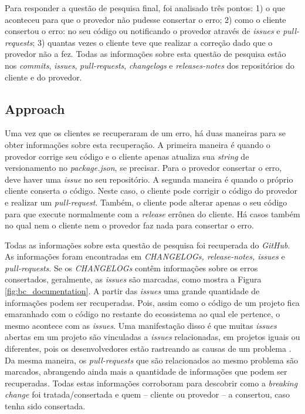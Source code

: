 Para responder a questão de pesquisa final, foi analisado três pontos: 1) o que aconteceu para que o provedor não pudesse consertar o erro; 2) como o cliente consertou o erro: no seu código ou notificando o provedor através de \textit{issues} e \textit{pull-requests}; 3) quantas vezes o cliente teve que realizar a correção dado que o provedor não a fez. Todas as informações sobre esta questão de pesquisa estão nos \textit{commits}, \textit{issues}, \textit{pull-requests}, \textit{changelogs} e \textit{releases-notes} dos repositórios do cliente e do provedor.

\subsection{Approach}
\label{apr:rq3}

Uma vez que os clientes se recuperaram de um erro, há duas maneiras para se obter informações sobre esta recuperação. A primeira maneira é quando o provedor corrige seu código e o cliente apenas atualiza sua \textit{string} de versionamento no \textit{package.json}, se precisar. Para o provedor consertar o erro, deve haver uma \textit{issue} no seu repositório. A segunda maneira é quando o próprio cliente conserta o código. Neste caso, o cliente pode corrigir o código do provedor e realizar um \textit{pull-request}. Também, o cliente pode alterar apenas o seu código para que execute normalmente com a \textit{release} errônea do cliente. Há casos também no qual nem o cliente nem o provedor faz nada para consertar o erro.

Todas as informações sobre esta questão de pesquisa foi recuperada do \textit{GitHub}. As informações foram encontradas em \textit{CHANGELOGs, release-notes, issues} e \textit{pull-requests}. Se os \textit{CHANGELOGs} contêm informações sobre os erros consertados, geralmente, as \textit{issues} são marcadas, como mostra a Figura \ref{fig:bc_documentation}. A partir das \textit{issues} uma grande quantidade de informações podem ser recuperadas. Pois, assim como o código de um projeto fica emaranhado com o código no restante do ecossistema ao qual ele pertence, o mesmo acontece com as \textit{issues}. Uma manifestação disso é que muitas \textit{issues} abertas em um projeto são vinculadas a \textit{issues} relacionadas, em projetos iguais ou diferentes, pois os desenvolvedores estão rastreando as causas de um problema \cite{Zhang:2018:WIL:3242887.3242891}. Da mesma maneira, os \textit{pull-requests} que são relacionados ao mesmo problema são marcados, abrangendo ainda mais a quantidade de informações que podem ser recuperadas. Todas estas informações corroboram para descobrir como a \textit{breaking change} foi tratada/consertada e quem -- cliente ou provedor -- a consertou, caso tenha sido consertada.


